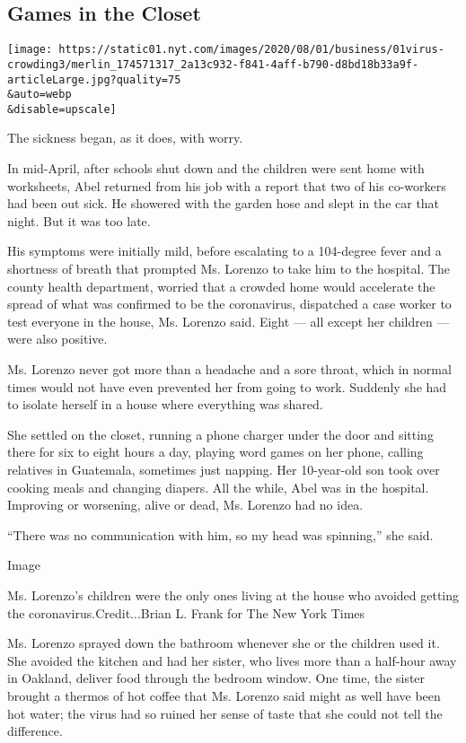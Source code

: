 \hypertarget{games-in-the-closet}{%
\subsection{Games in the Closet}\label{games-in-the-closet}}

\texttt{[image: https://static01.nyt.com/images/2020/08/01/business/01virus-crowding3/merlin\_174571317\_2a13c932-f841-4aff-b790-d8bd18b33a9f-articleLarge.jpg?quality=75\\\&auto=webp\\\&disable=upscale]}

The sickness began, as it does, with worry.

In mid-April, after schools shut down and the children were sent home
with worksheets, Abel returned from his job with a report that two of
his co-workers had been out sick. He showered with the garden hose and
slept in the car that night. But it was too late.

His symptoms were initially mild, before escalating to a 104-degree
fever and a shortness of breath that prompted Ms. Lorenzo to take him to
the hospital. The county health department, worried that a crowded home
would accelerate the spread of what was confirmed to be the coronavirus,
dispatched a case worker to test everyone in the house, Ms. Lorenzo
said. Eight --- all except her children --- were also positive.

Ms. Lorenzo never got more than a headache and a sore throat, which in
normal times would not have even prevented her from going to work.
Suddenly she had to isolate herself in a house where everything was
shared.

She settled on the closet, running a phone charger under the door and
sitting there for six to eight hours a day, playing word games on her
phone, calling relatives in Guatemala, sometimes just napping. Her
10-year-old son took over cooking meals and changing diapers. All the
while, Abel was in the hospital. Improving or worsening, alive or dead,
Ms. Lorenzo had no idea.

``There was no communication with him, so my head was spinning,'' she
said.

Image

Ms. Lorenzo's children were the only ones living at the house who
avoided getting the coronavirus.Credit...Brian L. Frank for The New York
Times

Ms. Lorenzo sprayed down the bathroom whenever she or the children used
it. She avoided the kitchen and had her sister, who lives more than a
half-hour away in Oakland, deliver food through the bedroom window. One
time, the sister brought a thermos of hot coffee that Ms. Lorenzo said
might as well have been hot water; the virus had so ruined her sense of
taste that she could not tell the difference.

